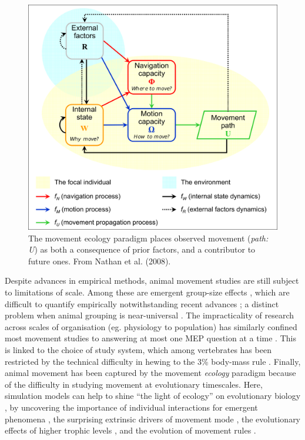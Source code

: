 \begin{figure}
    \includegraphics[width=0.7\linewidth]{fig02_nathan_etal_2008.png}
    \caption{The movement ecology paradigm places observed movement (\emph{path: U}) as both a consequence of prior factors, and a contributor to future ones. From Nathan et al. (2008).}
    \label{fig:fig02nathanetal2008}
\end{figure}

Despite advances in empirical methods, animal movement studies are still
subject to limitations of scale. Among these are emergent group-size
effects \citep{tunstrom2013}, which are difficult to quantify
empirically notwithstanding recent advances
\citep{handegard2012, kays2015, strandburg-peshkin2015a, dhanjal-adams2018};
a distinct problem when animal grouping is near-universal
\citep{krause2002}. The impracticality of research across scales of
organisation (eg. physiology to population) has similarly confined most
movement studies to answering at most one MEP question at a time
\citep[but see][]{fryxell2008, strandburg-peshkin2015a, curtin2018}.
This is linked to the choice of study system, which among vertebrates
has been restricted by the technical difficulty in hewing to the 3\%
body-mass rule \citep{naef-daenzer2001}. Finally, animal movement has
been captured by the movement \emph{ecology} paradigm because of the
difficulty in studying movement at evolutionary timescales. Here,
simulation models can help to shine ``the light of ecology'' on
evolutionary biology \citep{grant2008}, by uncovering the importance of
individual interactions for emergent phenomena
\citep[e.g.][]{hildenbrandt2010, tunstrom2013}, the surprising extrinsic
drivers of movement mode \citep{guttal2012}, the evolutionary effects of
higher trophic levels \citep{ioannou2012}, and the evolution of movement
rules \citep{dejager2011, netz2017}.


